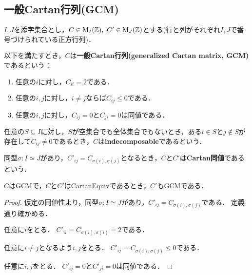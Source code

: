 \subsection{一般Cartan行列(GCM)}

$I, J$を添字集合とし，$C \in \operatorname{M}_I(\mathbb{Z}),\ C' \in \operatorname{M}_J(\mathbb{Z})$とする(行と列がそれぞれ$I, J$で番号づけられている正方行列)．

\begin{definition}
  \label{def:IsGeneralizedCartanMatrix}
  \leanok
  以下を満たすとき，$C$は\textbf{一般Cartan行列(generalized Cartan matrix, GCM)}であるという：
  \begin{enumerate}[label=(\roman*)]
    \item 任意の$i$に対し，$C_{ii} = 2$である．
    \item 任意の$i, j$に対し，$i \ne j$ならば$C_{ij} \le 0$である．
    \item 任意の$i, j$に対し，$C_{ij} = 0$と$C_{ji} = 0$は同値である．
  \end{enumerate}
\end{definition}

\begin{definition}
  \label{def:IsIndecomposable}
  \leanok
  任意の$S \subseteq I$に対し，$S$が空集合でも全体集合でもないとき，ある$i \in S$と$j \notin S$が存在して$C_{ij} \ne 0$であるとき，$C$は\textbf{indecomposable}であるという．
\end{definition}

\begin{definition}
  \label{def:CartanEquiv}
  \leanok
  同型$\sigma : I \simeq J$があり，$C'_{ij} = C_{\sigma(i), \sigma(j)}$となるとき，$C$と$C'$は\textbf{Cartan同値}であるという．
\end{definition}

\begin{theorem}
  \label{thm:IsGeneralizedCartanMatrix.of_cartanEquiv}
  \leanok
  \uses{}
  $C$はGCMで，$C$と$C'$はCartanEquivであるとき，$C'$もGCMである．
\end{theorem}

\begin{proof}
  仮定の同値性より，同型$\sigma : I \simeq J$があり，$C'_{ij} = C_{\sigma(i), \sigma(j)}$である．
  定義通り確かめる．

  任意に$i$をとる．
  $C'_{ii} = C_{\sigma(i), \sigma(i)} = 2$である．

  任意に$i \ne j$となるよう$i, j$をとる．
  $C'_{ij} = C_{\sigma(i), \sigma(j)} \le 0$である．

  任意に$i, j$をとる．
  $C'_{ij} = 0$と$C'_{ji} = 0$は同値である．
\end{proof}

